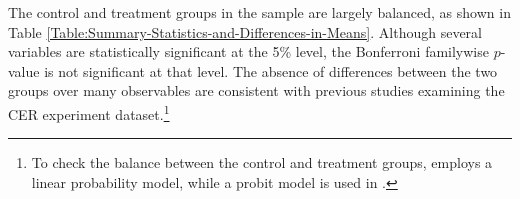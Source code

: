 The control and treatment groups in the sample are largely balanced, as shown in Table \ref{Table:Summary-Statistics-and-Differences-in-Means}. Although several variables are statistically significant at the 5\% level, the Bonferroni familywise $p$-value is not significant at that level. The absence of differences between the two groups over many observables are consistent with previous studies examining the CER experiment dataset.\footnote{To check the balance between the control and treatment groups, \cite{Peaking-Interest:How-Awareness-Drives-the-Effectiveness-of-Time-of-Use-Electricity-Pricing_Prest_2020} employs a linear probability model, while a probit model is used in \cite{The-Effect-of-Information-on-TOU-Electricity-Use:An-Irish-Residential-Study_Pon_2017}.} 

